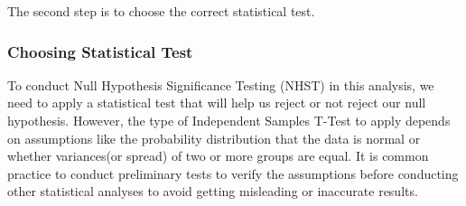 \documentclass{article}
\begin{document}
The second step is to choose the correct statistical test.

\subsubsection{Choosing Statistical Test}
To conduct Null Hypothesis Significance Testing (NHST) in this analysis, we need to apply a statistical test that will help us reject or not reject our null hypothesis. However, the type of Independent Samples T-Test to apply depends on assumptions like the probability distribution that the data is normal or whether variances(or spread) of two or more groups are equal. It is common practice to conduct preliminary tests to verify the assumptions before conducting other statistical analyses to avoid getting misleading or inaccurate results.
\end{document}
